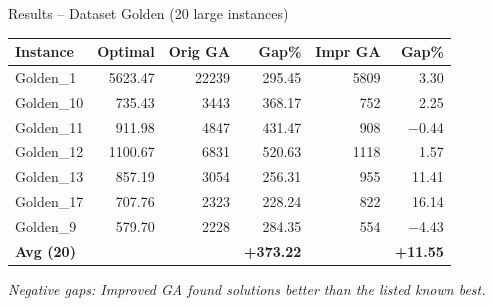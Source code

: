 \documentclass{beamer}
\begin{document}
\begin{frame}{Results -- Dataset Golden (20 large instances)}
  \begin{center}
  \small
  \begin{tabular}{lrrrrr}
    \toprule
    Instance   & Optimal  & Orig GA & Gap\%  & Impr GA & Gap\%  \\
    \midrule
    Golden\_1  & 5623.47  & 22239   & 295.45 & 5809    & 3.30   \\
    Golden\_10 &  735.43  &  3443   & 368.17 &  752    & 2.25   \\
    Golden\_11 &  911.98  &  4847   & 431.47 &  908    & $-$0.44 \\
    Golden\_12 & 1100.67  &  6831   & 520.63 & 1118    & 1.57   \\
    Golden\_13 &  857.19  &  3054   & 256.31 &  955    & 11.41  \\
    Golden\_17 &  707.76  &  2323   & 228.24 &  822    & 16.14  \\
    Golden\_9  &  579.70  &  2228   & 284.35 &  554    & $-$4.43 \\
    \midrule
    \textbf{Avg (20)} & & & \textbf{+373.22} & & \textbf{+11.55} \\
    \bottomrule
  \end{tabular}
  \end{center}
  \vspace{2pt}
  \textit{\small Negative gaps: Improved GA found solutions better than the listed known best.}
\end{frame}
\end{document}
